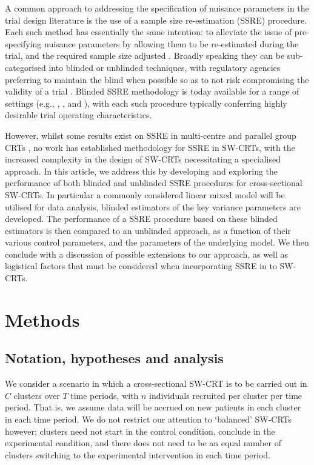 \documentclass{article}
\begin{document}
A common approach to addressing the specification of nuisance parameters in the trial design literature is the use of a sample size re-estimation (SSRE) procedure. Each such method has essentially the same intention: to alleviate the issue of pre-specifying nuisance parameters by allowing them to be re-estimated during the trial, and the required sample size adjusted \citep{proschan2009}. Broadly speaking they can be sub-categorised into blinded or unblinded techniques, with regulatory agencies preferring to maintain the blind when possible so as to not risk compromising the validity of a trial \citep{ich1998}. Blinded SSRE methodology is today available for a range of settings (e.g., \citet{friede2013}, \citet{golkowski2014}, and \citet{kunz2017}), with each such procedure typically conferring highly desirable trial operating characteristics.

However, whilst some results exist on SSRE in multi-centre \citep{jensen2010} and parallel group CRTs \citep{vanschie2014}, no work has established methodology for SSRE in SW-CRTs, with the increased complexity in the design of SW-CRTs necessitating a specialised approach. In this article, we address this by developing and exploring the performance of both blinded and unblinded SSRE procedures for cross-sectional SW-CRTs. In particular a commonly considered linear mixed model will be utilised for data analysis, blinded estimators of the key variance parameters are developed. The performance of a SSRE procedure based on these blinded estimators is then compared to an unblinded approach, as a function of their various control parameters, and the parameters of the underlying model. We then conclude with a discussion of possible extensions to our approach, as well as logistical factors that must be considered when incorporating SSRE in to SW-CRTs.

\section{Methods}

\subsection{Notation, hypotheses and analysis}

We consider a scenario in which a cross-sectional SW-CRT is to be carried out in $C$ clusters over $T$ time periods, with $n$ individuals recruited per cluster per time period. That is, we assume data will be accrued on new patients in each cluster in each time period. We do not restrict our attention to `balanced' SW-CRTs however; clusters need not start in the control condition, conclude in the experimental condition, and there does not need to be an equal number of clusters switching to the experimental intervention in each time period.
\end{document}

